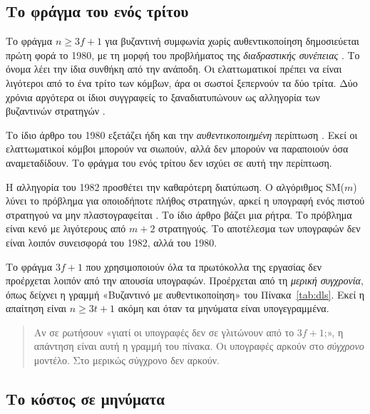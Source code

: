 \subsection{Το φράγμα του ενός τρίτου}

Το φράγμα $n \ge 3f+1$ για βυζαντινή συμφωνία χωρίς αυθεντικοποίηση
δημοσιεύεται πρώτη φορά το 1980, με τη μορφή του προβλήματος της
\emph{διαδραστικής συνέπειας} \cite{pease1980reaching}. Το όνομα λέει
την ίδια συνθήκη από την ανάποδη. Οι ελαττωματικοί πρέπει να είναι
λιγότεροι από το ένα τρίτο των κόμβων, άρα οι σωστοί ξεπερνούν τα δύο
τρίτα. Δύο χρόνια αργότερα οι ίδιοι συγγραφείς το ξαναδιατυπώνουν ως
αλληγορία των βυζαντινών στρατηγών \cite{lamport1982byzantine}.

Το ίδιο άρθρο του 1980 εξετάζει ήδη και την \emph{αυθεντικοποιημένη}
περίπτωση \cite{pease1980reaching}. Εκεί οι ελαττωματικοί κόμβοι μπορούν
να σιωπούν, αλλά δεν μπορούν να παραποιούν όσα αναμεταδίδουν. Το φράγμα
του ενός τρίτου δεν ισχύει σε αυτή την περίπτωση.

Η αλληγορία του 1982 προσθέτει την καθαρότερη διατύπωση. Ο αλγόριθμος
SM($m$) λύνει το πρόβλημα για οποιοδήποτε πλήθος στρατηγών, αρκεί η
υπογραφή ενός πιστού στρατηγού να μην πλαστογραφείται
\cite{lamport1982byzantine}. Το ίδιο άρθρο βάζει μια ρήτρα. Το πρόβλημα
είναι κενό με λιγότερους από $m{+}2$ στρατηγούς. Το αποτέλεσμα των
υπογραφών δεν είναι λοιπόν συνεισφορά του 1982, αλλά του 1980.

Το φράγμα $3f{+}1$ που χρησιμοποιούν όλα τα πρωτόκολλα της εργασίας δεν
προέρχεται λοιπόν από την απουσία υπογραφών. Προέρχεται από τη
\emph{μερική συγχρονία}, όπως δείχνει η γραμμή «Βυζαντινό με
αυθεντικοποίηση» του Πίνακα~\ref{tab:dls}. Εκεί η απαίτηση είναι
$n \ge 3t{+}1$ ακόμη και όταν τα μηνύματα είναι υπογεγραμμένα.

\begin{quote}\small
Αν σε ρωτήσουν «γιατί οι υπογραφές δεν σε γλιτώνουν από το $3f{+}1$;», η
απάντηση είναι αυτή η γραμμή του πίνακα. Οι υπογραφές αρκούν στο
\emph{σύγχρονο} μοντέλο. Στο μερικώς σύγχρονο δεν αρκούν.
\end{quote}

\subsection{Το κόστος σε μηνύματα}

